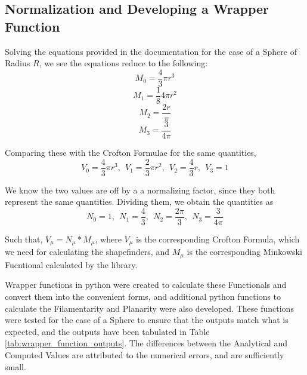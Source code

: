 \documentclass{article}
\begin{document}
\subsection{Normalization and Developing a Wrapper Function}

Solving the equations provided in the documentation for the case of a Sphere of Radius $R$, we see the equations reduce to the following:
\begin{equation}
    M_0 = \frac 4 3 \pi r^3
\end{equation}
\begin{equation}
    M_1 = \frac 1 8 4 \pi r^2
\end{equation}
\begin{equation}
    M_2 = \frac {2 r}{\pi} 
\end{equation}
\begin{equation}
    M_3 = \frac {3}{4 \pi}
\end{equation}

Comparing these with the Crofton Formulae \cite{AmitSetaThesis} for the same quantities,
$$V_0 = \frac 4 3 \pi r^3, \:\: V_1 = \frac 2 3 \pi r^2, \:\: V_2 = \frac 4 3 r, \:\: V_3 = 1$$

We know the two values are off by a a normalizing factor, since they both represent the same quantities. Dividing them, we obtain the quantities as
\begin{equation}
    N_0 = 1, \: \: N_1 = \frac 4 3 ,\: \: N_2 = \frac {2 \pi}{3} ,\: \: N_3 = \frac{3}{4 \pi} 
\end{equation} 

Such that, $V_\mu = N_\mu * M_\mu$, where $V_\mu$ is the corresponding Crofton Formula, which we need for calculating the shapefinders, and $M_\mu$ is the corresponding Minkowski Fucntional calculated by the library.


Wrapper functions in python were created to calculate these Functionals and convert them into the convenient forms, and additional python functions to calculate the Filamentarity and Planarity were also developed. These functions were tested for the case of a Sphere to ensure that the outputs match what is expected, and the outputs have been tabulated in Table \ref{tab:wrapper_function_outputs}. The differences between the Analytical and Computed Values are attributed to the numerical errors, and are sufficiently small.
\end{document}
